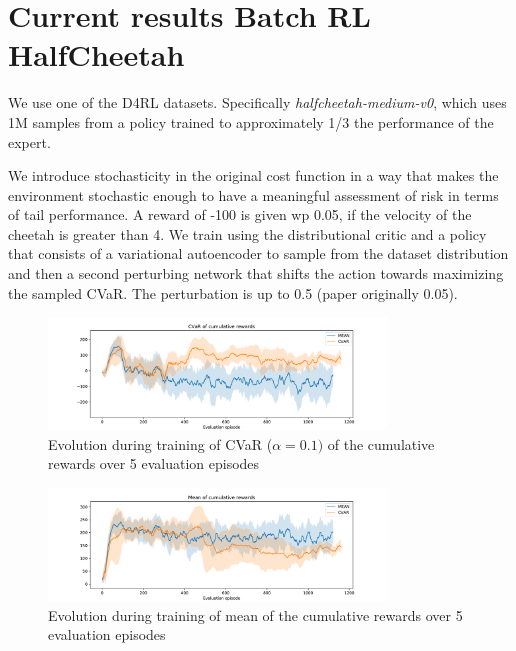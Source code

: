 
\section{Current results Batch RL HalfCheetah}
We use one of the D4RL datasets.
Specifically \textit{halfcheetah-medium-v0}, which uses 1M samples from a policy trained
to approximately 1/3 the performance of the expert.

We introduce stochasticity in the original cost function in a way that 
makes the environment stochastic enough to have a meaningful assessment of risk in terms of 
tail performance.
A reward of -100 is given wp 0.05, if the velocity of the cheetah is greater than 4.
We train using the distributional critic and a policy that consists of a variational autoencoder
to sample from the dataset distribution and then a second perturbing network that shifts the
action towards maximizing the sampled CVaR.
The perturbation is up to 0.5 (paper originally 0.05).

\begin{figure}[ht]
        \centering
        \includegraphics[width=0.8\textwidth]{images/Cheetah_offpolicy_medium/cvar_train_withstds.pdf}
        \caption{Evolution during training of CVaR ($\alpha=0.1)$ of the cumulative rewards
        over 5 evaluation episodes}
        \label{cvar_cheetah}
    
\end{figure}

\begin{figure}[ht]
    \centering
    \includegraphics[width=0.8\textwidth]{images/Cheetah_offpolicy_medium/mean_train_withstds.pdf}
    \caption{Evolution during training of mean of the cumulative rewards over 5 evaluation episodes}
    \label{mean_cheetah}

\end{figure}



